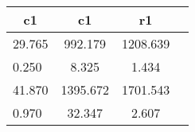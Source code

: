 \begin{table}[htbp]
\begin{tabular}{lccc} \hline \hline
 \multicolumn{1}{c}{ c1 }  & c1  & r1  \\  \hline 
   29.765 &   992.179 &  1208.639 \\  
    0.250 &     8.325 &     1.434 \\  
   41.870 &  1395.672 &  1701.543 \\  
    0.970 &    32.347 &     2.607 \\  
\hline \hline \end{tabular}
\end{table}
